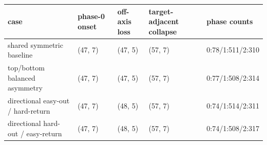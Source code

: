 \begin{tabular}{lllll}
\toprule
case & phase-0 onset & off-axis loss & target-adjacent collapse & phase counts \\
\midrule
shared symmetric baseline & (47, 7) & (47, 5) & (57, 7) & 0:78/1:511/2:310 \\
top/bottom balanced asymmetry & (47, 7) & (47, 5) & (57, 7) & 0:77/1:508/2:314 \\
directional easy-out / hard-return & (47, 7) & (48, 5) & (57, 7) & 0:74/1:514/2:311 \\
directional hard-out / easy-return & (47, 7) & (48, 5) & (57, 7) & 0:74/1:508/2:317 \\
\bottomrule
\end{tabular}
